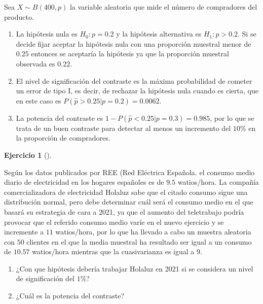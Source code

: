\documentclass[
  spanish,
  a4paper,
]{scrreport}
\theoremstyle{definition}
\newtheorem{exercise}{Ejercicio}[chapter]
\theoremstyle{remark}
\begin{document}
\begin{tcolorbox}[enhanced jigsaw, arc=.35mm, bottomrule=.15mm, bottomtitle=1mm, breakable, colback=white, colbacktitle=quarto-callout-tip-color!10!white, colframe=quarto-callout-tip-color-frame, coltitle=black, left=2mm, leftrule=.75mm, opacityback=0, opacitybacktitle=0.6, rightrule=.15mm, title=\textcolor{quarto-callout-tip-color}{\faLightbulb}\hspace{0.5em}{Solución}, titlerule=0mm, toprule=.15mm, toptitle=1mm]

Sea \(X\sim B(400,p)\) la variable aleatoria que mide el número de
compradores del producto.

\begin{enumerate}
\def\labelenumi{\alph{enumi}.}
\item
  La hipótesis nula es \(H_0: p=0.2\) y la hipótesis alternativa es
  \(H_1: p> 0.2\). Si se decide fijar aceptar la hipótesis nula con una
  proporción muestral menor de \(0.25\) entonces se aceptaría la
  hipótesis ya que la proporción muestral observada es \(0.22\).
\item
  El nivel de significación del contraste es la máxima probabilidad de
  cometer un error de tipo I, es decir, de rechazar la hipótesis nula
  cuando es cierta, que en este caso es
  \(P(\hat p>0.25|p=0.2) = 0.0062\).
\item
  La potencia del contraste es \(1-P(\hat p<0.25|p=0.3) = 0.985\), por
  lo que se trata de un buen contraste para detectar al menos un
  incremento del \(10\)\% en la proporción de compradores.
\end{enumerate}

\end{tcolorbox}

\begin{exercise}[]\protect\hypertarget{exr-contraste-media-consumo-electrico}{}\label{exr-contraste-media-consumo-electrico}

Según los datos publicados por REE (Red Eléctrica Española. el consumo
medio diario de electricidad en los hogares españoles es de \(9.5\)
watios/hora. La compañía comercializadora de electricidad Holaluz sabe
que el citado consumo sigue una distribución normal, pero debe
determinar cuál será el consumo medio en el que basará su estrategia de
cara a 2021, ya que el aumento del teletrabajo podría provocar que el
referido consumo medio varíe en el nuevo ejercicio y se incremente a
\(11\) watios/hora, por lo que ha llevado a cabo un muestra aleatoria
con \(50\) clientes en el que la media muestral ha resultado ser igual a
un consumo de \(10.57\) watios/hora mientras que la cuasivarianza es
igual a \(9\).

\begin{enumerate}
\def\labelenumi{\alph{enumi}.}
\item
  ¿Con que hipótesis debería trabajar Holaluz en 2021 si se considera un
  nivel de significación del \(1\)\%?
\item
  ¿Cuál es la potencia del contraste?
\end{enumerate}

\end{exercise}
\end{document}
